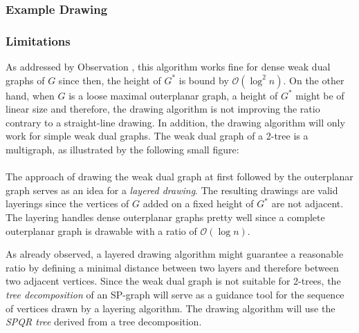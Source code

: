 \subsubsection{Example Drawing}


\subsubsection{Limitations}

As addressed by Observation %
, this algorithm works fine for dense weak dual graphs of $G$ since then, the height of $G^*$ is bound by $\mathcal{O}(\log^2 n)$. On the other hand, when $G$ is a loose maximal outerplanar graph, a height of $G^*$ might be of linear size and therefore, the drawing algorithm is not improving the ratio contrary to a straight-line drawing. In addition, the drawing algorithm will only work for simple weak dual graphs. The weak dual graph of a 2-tree is a multigraph, as illustrated by the following small figure:\\
\\
The approach of drawing the weak dual graph at first followed by the outerplanar graph serves as an idea for a \emph{layered drawing}. The resulting drawings are valid layerings since the vertices of $G$ added on a fixed height of $G^*$ are not adjacent. The layering handles dense outerplanar graphs pretty well since a complete outerplanar graph is drawable with a ratio of $\mathcal{O}(\log n)$. 

As already observed, a layered drawing algorithm might guarantee a reasonable ratio by defining a minimal distance between two layers and therefore between two adjacent vertices. Since the weak dual graph is not suitable for 2-trees, the \emph{tree decomposition} of an SP-graph will serve as a guidance tool for the sequence of vertices drawn by a layering algorithm. The drawing algorithm will use the \emph{SPQR tree} derived from a tree decomposition.

